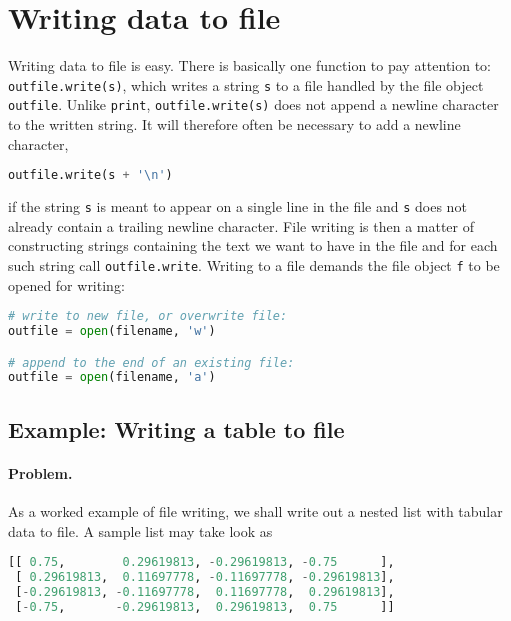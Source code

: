 \documentclass[graybox,sectrefs,envcountresetchap,open=right,final]{svmonodo}
\begin{document}
\section{Writing data to file}
\label{sec:files:writing}
Writing data to file is easy.
There is basically one function to pay attention to: \texttt{outfile.write(s)},
which writes a string \texttt{s} to
a file handled by the file object \texttt{outfile}. Unlike \texttt{print},
\texttt{outfile.write(s)}
does not append a newline character to the written string.
It will therefore
often be necessary to add a newline character,
\begin{lstlisting}[language=Python,style=simple,xleftmargin=2mm]
outfile.write(s + '\n')

\end{lstlisting}

if the string \texttt{s} is meant to appear on a single line in the file
and \texttt{s} does not already contain a trailing newline character.
File writing is then a matter of constructing strings containing the
text we want to have in the file and for each such string call
\texttt{outfile.write}.
Writing to a file demands
the file object \texttt{f}
to be opened for writing:
\begin{lstlisting}[language=Python,style=simple,xleftmargin=2mm]
# write to new file, or overwrite file:
outfile = open(filename, 'w')

# append to the end of an existing file:
outfile = open(filename, 'a')

\end{lstlisting}

\subsection{Example: Writing a table to file}
\paragraph{Problem.}
As a worked example of file writing,
we shall write out a nested list with tabular data to file.
A sample list may take look as
\begin{lstlisting}[language=Python,style=simple,xleftmargin=2mm]
[[ 0.75,        0.29619813, -0.29619813, -0.75      ],
 [ 0.29619813,  0.11697778, -0.11697778, -0.29619813],
 [-0.29619813, -0.11697778,  0.11697778,  0.29619813],
 [-0.75,       -0.29619813,  0.29619813,  0.75      ]]

\end{lstlisting}
\end{document}
